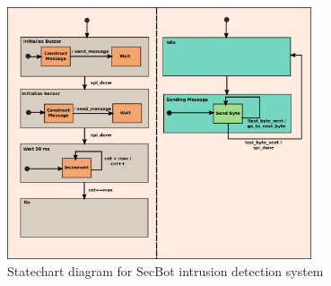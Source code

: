 \begin{figure}[]
  \begin{centering}
  \includegraphics[width=0.8\textwidth]{figures/Buzzer&Sensor_2}
  \caption{Statechart diagram for SecBot intrusion detection system}
  \label{fig:BuzzerSensor_2}
  \end{centering}
\end{figure} 




